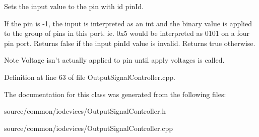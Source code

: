 Sets the input value to the pin with id pin\-Id. 

If the pin is -\/1, the input is interpreted as an int and the binary value is applied to the group of pins in this port. ie. 0x5 would be interpreted as 0101 on a four pin port. Returns false if the input pin\-Id value is invalid. Returns true otherwise. \begin{DoxyNote}{Note}
Voltage isn't actually applied to pin until apply voltages is called. 
\end{DoxyNote}


Definition at line 63 of file Output\-Signal\-Controller.\-cpp.



The documentation for this class was generated from the following files\-:\begin{DoxyCompactItemize}
\item 
source/common/iodevices/Output\-Signal\-Controller.\-h\item 
source/common/iodevices/Output\-Signal\-Controller.\-cpp\end{DoxyCompactItemize}
